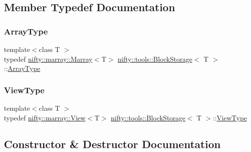 \subsection{Member Typedef Documentation}
\mbox{\label{classnifty_1_1tools_1_1BlockStorage_af39a2936478b64389c56a5c6ef5aab7d}} 
\subsubsection{\texorpdfstring{Array\+Type}{ArrayType}}
{\footnotesize\ttfamily template$<$class T $>$ \\
typedef \hyperlink{classandres_1_1Marray}{nifty\+::marray\+::\+Marray}$<$T$>$ \hyperlink{classnifty_1_1tools_1_1BlockStorage}{nifty\+::tools\+::\+Block\+Storage}$<$ T $>$\+::\hyperlink{classnifty_1_1tools_1_1BlockStorage_af39a2936478b64389c56a5c6ef5aab7d}{Array\+Type}}

\mbox{\label{classnifty_1_1tools_1_1BlockStorage_afe259433c35f56d01be0b597a696e090}} 
\subsubsection{\texorpdfstring{View\+Type}{ViewType}}
{\footnotesize\ttfamily template$<$class T $>$ \\
typedef \hyperlink{classandres_1_1View}{nifty\+::marray\+::\+View}$<$T$>$ \hyperlink{classnifty_1_1tools_1_1BlockStorage}{nifty\+::tools\+::\+Block\+Storage}$<$ T $>$\+::\hyperlink{classnifty_1_1tools_1_1BlockStorage_afe259433c35f56d01be0b597a696e090}{View\+Type}}



\subsection{Constructor \& Destructor Documentation}
\mbox{\label{classnifty_1_1tools_1_1BlockStorage_a95d95c49b1a1ed51c6d794d3fe8f2645}} 
